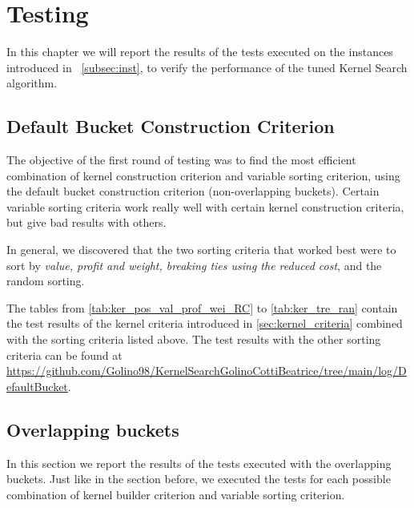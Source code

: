 \chapter{Testing}
In this chapter we will report the results of the tests executed
on the instances introduced in ~\ref{subsec:inst},
to verify the performance of the tuned Kernel Search algorithm.

\section{Default Bucket Construction Criterion}
The objective of the first round of testing was to find the most efficient
combination of kernel construction criterion and variable sorting criterion, using the default bucket construction criterion (non-overlapping buckets).
Certain variable sorting criteria work really well with certain kernel construction criteria, but give bad results with others.

In general, we discovered that the two sorting criteria that
worked best were to sort by \textit{value, profit and weight, breaking ties using the reduced cost}, and the random sorting.

The tables from \ref{tab:ker_pos_val_prof_wei_RC} to \ref{tab:ker_tre_ran} contain the test results of the kernel criteria introduced in \ref{sec:kernel_criteria} combined with the sorting criteria listed above.
The test results with the other sorting criteria can be found at
\url{https://github.com/Golino98/KernelSearchGolinoCottiBeatrice/tree/main/log/DefaultBucket}.










\section{Overlapping buckets}
In this section we report the results of the tests executed with the overlapping buckets. Just like in the section before, we executed the tests for each possible combination of kernel builder criterion and variable sorting criterion.

